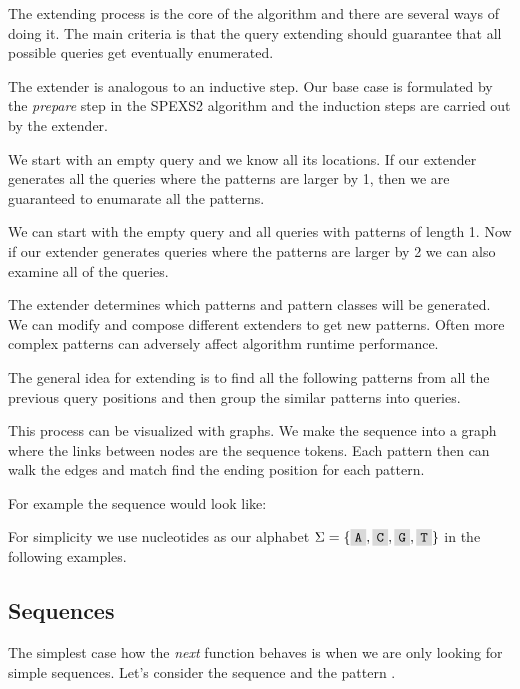 The extending process is the core of the algorithm and there are several ways of doing it. The main criteria is that the query extending should guarantee that all possible queries get eventually enumerated.

The extender is analogous to an inductive step. Our base case is formulated by the \emph{prepare} step in the SPEXS2 algorithm and the induction steps are carried out by the extender.

\begin{exmp}
We start with an empty query and we know all its locations. If our extender generates all the queries where the patterns are larger by 1, then we are guaranteed to enumarate all the patterns.
\end{exmp}

\begin{exmp}
We can start with the empty query and all queries with patterns of length 1. Now if our extender generates queries where the patterns are larger by 2 we can also examine all of the queries.
\end{exmp}

The extender determines which patterns and pattern classes will be generated. We can modify and compose different extenders to get new patterns. Often more complex patterns can adversely affect algorithm runtime performance.

The general idea for extending is to find all the following patterns from all the previous query positions and then group the similar patterns into queries.

This process can be visualized with graphs. We make the sequence into a graph where the links between nodes are the sequence tokens. Each pattern then can walk the edges and match find the ending position for each pattern.

For example the sequence  would look like:

\begin{figure}[H]
	
\end{figure}

For simplicity we use nucleotides as our alphabet $\Sigma = \{ \R{A}, \R{C}, \R{G}, \R{T} \}$ in the following examples.

\subsection{Sequences}

The simplest case how the \emph{next} function behaves is when we are only looking for simple sequences. Let's consider the sequence  and the pattern .

